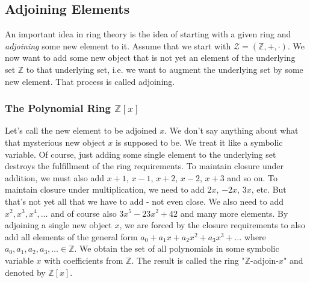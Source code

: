 






\subsection{Adjoining Elements}
An important idea in ring theory is the idea of starting with a given ring and \emph{adjoining} some new element to it. Assume that we start with $\mathcal{Z} = (\mathbb{Z},+,\cdot)$. We now want to add some new object that is not yet an element of the underlying set $\mathbb{Z}$ to that underlying set, i.e. we want to augment the underlying set by some new element. That process is called adjoining. 

\subsubsection{The Polynomial Ring $\mathbb{Z}[x]$}
Let's call the new element to be adjoined $x$. We don't say anything about what that mysterious new object $x$ is supposed to be. We treat it like a symbolic variable. Of course, just adding some single element to the underlying set destroys the fulfillment of the ring requirements. To maintain closure under addition, we must also add $x+1$, $x-1$, $x+2$, $x-2$, $x+3$ and so on. To maintain closure under multiplication, we need to add $2 x$, $-2 x$, $3 x$, etc. But that's not yet all that we have to add - not even close. We also need to add $x^2, x^3, x^4, \ldots$ and of course also $3 x^5 - 23 x^2 + 42$ and many more elements. By adjoining a single new object $x$, we are forced by the closure requirements to also add all elements of the general form $a_0 + a_1 x + a_2 x^2 + a_3 x^3 + \ldots$ where $a_0, a_1, a_2, a_3, \ldots \in \mathbb{Z}$. We obtain the set of all polynomials in some symbolic variable $x$ with coefficients from $\mathbb{Z}$. The result is called the ring "$\mathbb{Z}$-adjoin-$x$" and denoted by $\mathbb{Z}[x]$.

